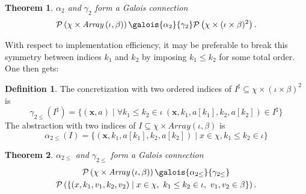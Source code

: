 \documentclass[a4paper]{article}
\newcommand{\ve}[1]{\mathbf{#1}}
\newcommand{\vx}{\ve{x}}
\newcommand{\arraytype}[2]{\mathit{Array}\left(#1,#2\right)}
\newcommand{\abstr}[1]{#1^\sharp}
\newcommand{\parts}[1]{\mathcal{P}\left(#1\right)}
\newcommand{\abstraction}[2][]{\alpha_{#1}\left(#2\right)}
\newcommand{\concretization}[2][]{\gamma_{#1}\left(#2\right)}
\theoremstyle{definition}
\newtheorem{definition}{Definition}
\theoremstyle{plain}
\newtheorem{theorem}{Theorem}
\begin{document}
\begin{theorem}
$\alpha_2$ and $\gamma_2$ form a Galois connection
\begin{equation*}
 \parts{\chi \times \arraytype{\iota}{\beta}}
 \galois{\alpha_2}{\gamma_2} \parts{\chi \times (\iota \times \beta)^2}.
\end{equation*}
\end{theorem}

With respect to implementation efficiency, it may be preferable to break this symmetry between indices $k_1$ and $k_2$ by imposing $k_1 \leq k_2$ for some total order. One then gets:

\begin{definition}
The concretization with two ordered indices of $\abstr{I} \subseteq \chi \times (\iota \times \beta)^2$ is
\begin{equation}
\concretization[2\leq]{\abstr{I}} = \{ (\vx,a) \mid
  \forall k_1 \leq k_2\in\iota~ (\vx,k_1,a[k_1],k_2,a[k_2]) \in \abstr{I} \}
\end{equation}
The abstraction with two indices of $I \subseteq \chi \times \arraytype{\iota}{\beta}$ is
\begin{equation}
\abstraction[2\leq]{I} = \{ (\vx,k_1,a[k_1],k_2,a[k_2]) \mid x \in \chi, k_1 \leq k_2 \in \iota \}
\end{equation}
\end{definition}

\begin{theorem}
$\alpha_{2\leq}$ and $\gamma_{2\leq}$ form a Galois connection
\begin{multline*}
 \parts{\chi \times \arraytype{\iota}{\beta}}
 \galois{\alpha_{2\leq}}{\gamma_{2\leq}}\\
 \parts{\{(x,k_1,v_1,k_2,v_2) \mid x \in \chi,~ k_1 \leq k_2 \in \iota,~ v_1, v_2 \in \beta \}}.
\end{multline*}
\end{theorem}
\end{document}
